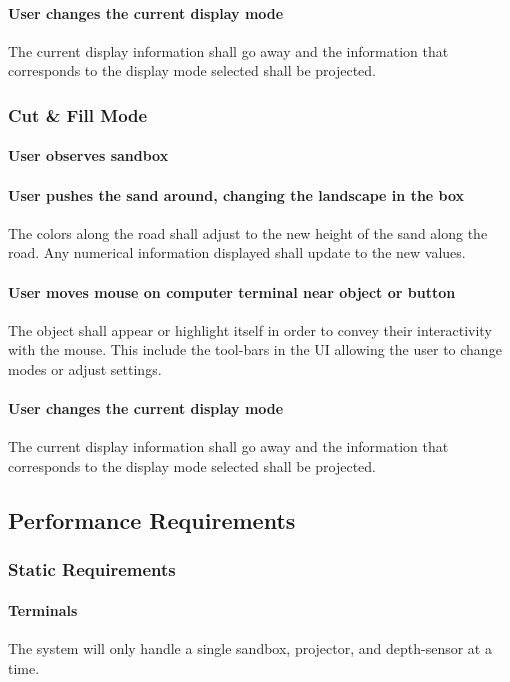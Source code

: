 \documentclass[onecolumn, draftclsnofoot,10pt, compsoc]{IEEEtran}
\begin{document}
\paragraph{User changes the current display mode}
The current display information shall go away and the information that corresponds to the display mode selected shall be projected.

\subsubsection{Cut \& Fill Mode}

\paragraph{User observes sandbox}


\paragraph{User pushes the sand around, changing the landscape in the box}
The colors along the road shall adjust to the new height of the sand along the road.  Any numerical information displayed shall update to the new values.

\paragraph{User moves mouse on computer terminal near object or button}
The object shall appear or highlight itself in order to convey their interactivity with the mouse.  This include the tool-bars in the UI allowing the user to change modes or adjust settings.

\paragraph{User changes the current display mode}
The current display information shall go away and the information that corresponds to the display mode selected shall be projected.


\subsection{Performance Requirements}
\subsubsection{Static Requirements}
\paragraph{Terminals}
The system will only handle a single sandbox, projector, and depth-sensor at a time.
\end{document}
